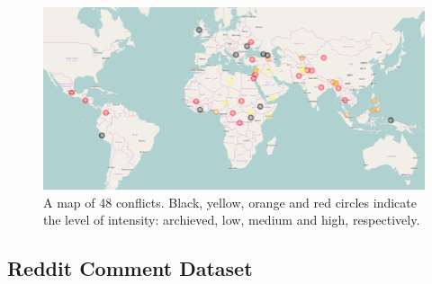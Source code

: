 \begin{figure}
\centering
\includegraphics[width=0.9\columnwidth]{map.png}
\caption{A map of 48 conflicts. Black, yellow, orange and red circles indicate the level of intensity: archieved, low, medium and high, respectively.}
\label{rot}
\end{figure}

\subsection{Reddit Comment Dataset}
